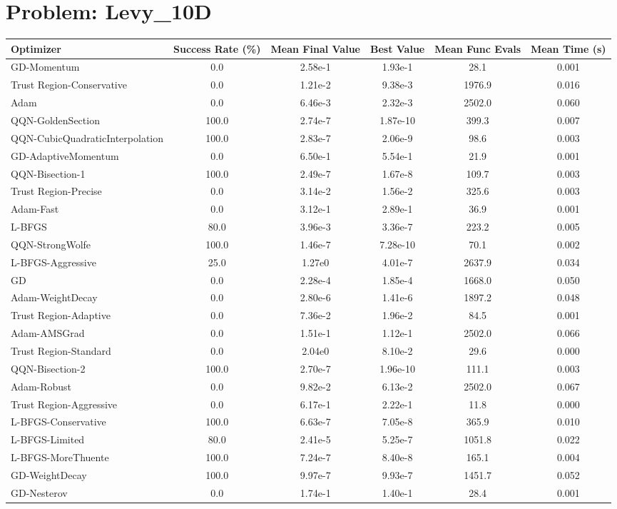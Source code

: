\documentclass{article}
\begin{document}
\section{Problem: Levy\_10D}
\begin{longtable}{p{3cm}*{5}{c}}
\toprule
\textbf{Optimizer} & \textbf{Success Rate (\%)} & \textbf{Mean Final Value} & \textbf{Best Value} & \textbf{Mean Func Evals} & \textbf{Mean Time (s)} \\
\midrule
GD-Momentum & 0.0 & 2.58e-1 & 1.93e-1 & 28.1 & 0.001 \\
Trust Region-Conservative & 0.0 & 1.21e-2 & 9.38e-3 & 1976.9 & 0.016 \\
Adam & 0.0 & 6.46e-3 & 2.32e-3 & 2502.0 & 0.060 \\
QQN-GoldenSection & 100.0 & 2.74e-7 & 1.87e-10 & 399.3 & 0.007 \\
QQN-CubicQuadraticInterpolation & 100.0 & 2.83e-7 & 2.06e-9 & 98.6 & 0.003 \\
GD-AdaptiveMomentum & 0.0 & 6.50e-1 & 5.54e-1 & 21.9 & 0.001 \\
QQN-Bisection-1 & 100.0 & 2.49e-7 & 1.67e-8 & 109.7 & 0.003 \\
Trust Region-Precise & 0.0 & 3.14e-2 & 1.56e-2 & 325.6 & 0.003 \\
Adam-Fast & 0.0 & 3.12e-1 & 2.89e-1 & 36.9 & 0.001 \\
L-BFGS & 80.0 & 3.96e-3 & 3.36e-7 & 223.2 & 0.005 \\
QQN-StrongWolfe & 100.0 & 1.46e-7 & 7.28e-10 & 70.1 & 0.002 \\
L-BFGS-Aggressive & 25.0 & 1.27e0 & 4.01e-7 & 2637.9 & 0.034 \\
GD & 0.0 & 2.28e-4 & 1.85e-4 & 1668.0 & 0.050 \\
Adam-WeightDecay & 0.0 & 2.80e-6 & 1.41e-6 & 1897.2 & 0.048 \\
Trust Region-Adaptive & 0.0 & 7.36e-2 & 1.96e-2 & 84.5 & 0.001 \\
Adam-AMSGrad & 0.0 & 1.51e-1 & 1.12e-1 & 2502.0 & 0.066 \\
Trust Region-Standard & 0.0 & 2.04e0 & 8.10e-2 & 29.6 & 0.000 \\
QQN-Bisection-2 & 100.0 & 2.70e-7 & 1.96e-10 & 111.1 & 0.003 \\
Adam-Robust & 0.0 & 9.82e-2 & 6.13e-2 & 2502.0 & 0.067 \\
Trust Region-Aggressive & 0.0 & 6.17e-1 & 2.22e-1 & 11.8 & 0.000 \\
L-BFGS-Conservative & 100.0 & 6.63e-7 & 7.05e-8 & 365.9 & 0.010 \\
L-BFGS-Limited & 80.0 & 2.41e-5 & 5.25e-7 & 1051.8 & 0.022 \\
L-BFGS-MoreThuente & 100.0 & 7.24e-7 & 8.40e-8 & 165.1 & 0.004 \\
GD-WeightDecay & 100.0 & 9.97e-7 & 9.93e-7 & 1451.7 & 0.052 \\
GD-Nesterov & 0.0 & 1.74e-1 & 1.40e-1 & 28.4 & 0.001 \\
\bottomrule
\end{longtable}
\end{document}
